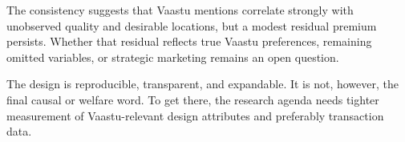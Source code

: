 \documentclass[11pt]{article}
\begin{document}
The consistency suggests that Vaastu mentions correlate strongly with unobserved quality and desirable locations, but a modest residual premium persists. Whether that residual reflects true Vaastu preferences, remaining omitted variables, or strategic marketing remains an open question.

The design is reproducible, transparent, and expandable. It is not, however, the final causal or welfare word. To get there, the research agenda needs tighter measurement of Vaastu-relevant design attributes and preferably transaction data.



\end{document}

